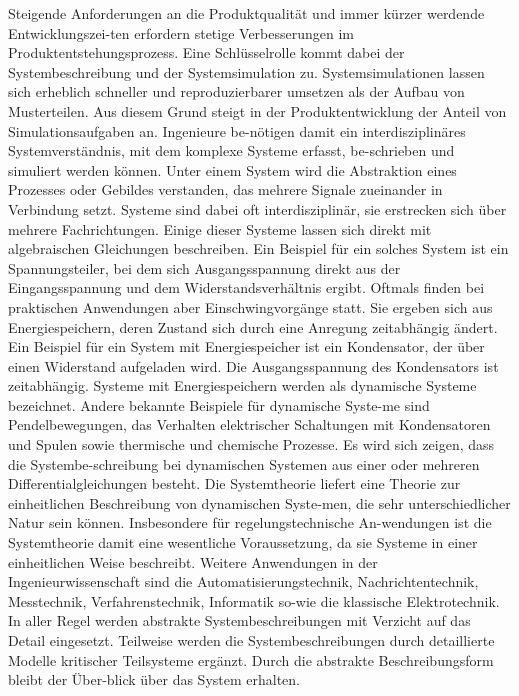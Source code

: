 Steigende Anforderungen an die Produktqualität und immer kürzer werdende Entwicklungszei-ten erfordern stetige Verbesserungen im Produktentstehungsprozess. Eine Schlüsselrolle kommt dabei der Systembeschreibung und der Systemsimulation zu. Systemsimulationen lassen sich erheblich schneller und reproduzierbarer umsetzen als der Aufbau von Musterteilen. Aus diesem Grund steigt in der Produktentwicklung der Anteil von Simulationsaufgaben an. Ingenieure be-nötigen damit ein interdisziplinäres Systemverständnis, mit dem komplexe Systeme erfasst, be-schrieben und simuliert werden können.\newline
Unter einem System wird die Abstraktion eines Prozesses oder Gebildes verstanden, das mehrere Signale zueinander in Verbindung setzt. Systeme sind dabei oft interdisziplinär, sie erstrecken sich über mehrere Fachrichtungen. Einige dieser Systeme lassen sich direkt mit algebraischen Gleichungen \newline beschreiben. Ein Beispiel für ein solches System ist ein Spannungsteiler, bei dem sich Ausgangsspannung direkt aus der Eingangsspannung und dem Widerstandsverhältnis ergibt. Oftmals finden bei praktischen Anwendungen aber Einschwingvorgänge statt. Sie ergeben sich aus Energiespeichern, deren Zustand sich durch eine Anregung zeitabhängig ändert. Ein Beispiel für ein System mit Energiespeicher ist ein Kondensator, der über einen Widerstand aufgeladen wird. Die Ausgangsspannung des Kondensators ist zeitabhängig. Systeme mit Energiespeichern werden als dynamische Systeme bezeichnet. Andere bekannte Beispiele für dynamische Syste-me sind Pendelbewegungen, das Verhalten elektrischer Schaltungen mit Kondensatoren und Spulen sowie thermische und chemische Prozesse. Es wird sich zeigen, dass die Systembe-schreibung bei dynamischen Systemen aus einer oder mehreren Differentialgleichungen besteht.\newline
Die Systemtheorie liefert eine Theorie zur einheitlichen Beschreibung von dynamischen Syste-men, die sehr unterschiedlicher Natur sein können. Insbesondere für regelungstechnische An-wendungen ist die Systemtheorie damit eine wesentliche Voraussetzung, da sie Systeme in einer einheitlichen Weise beschreibt. Weitere Anwendungen in der Ingenieurwissenschaft sind die Automatisierungstechnik, Nachrichtentechnik, Messtechnik, Verfahrenstechnik, Informatik so-wie die klassische Elektrotechnik. In aller Regel werden abstrakte Systembeschreibungen mit Verzicht auf das Detail eingesetzt. Teilweise werden die Systembeschreibungen durch detaillierte Modelle kritischer Teilsysteme ergänzt. Durch die abstrakte Beschreibungsform bleibt der Über-blick über das System erhalten. 

